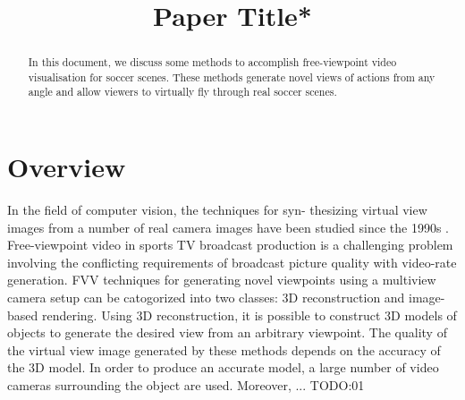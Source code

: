\documentclass[conference]{IEEEtran}
\begin{document}
\title{Paper Title*\\
}

\author{
}

\maketitle

\begin{abstract}
In this document, we discuss some methods to accomplish free-viewpoint video visualisation for soccer scenes.
These methods generate novel views of actions from any angle and allow viewers to virtually fly through real soccer scenes.
\end{abstract}




\section{Overview}
In the field of computer vision, the techniques for syn-
thesizing virtual view images from a number of real camera
images have been studied since the 1990s \cite{b1,b2,b3}.
Free-viewpoint video in sports TV broadcast production is a challenging problem involving the conflicting requirements of 
broadcast picture quality with video-rate generation.
FVV techniques for generating novel viewpoints using a multiview camera setup can be catogorized into two classes: 
3D reconstruction and image-based rendering. Using 3D reconstruction, it is possible to construct 3D models of objects to
generate the desired view from an arbitrary viewpoint. The quality of the virtual view image generated
by these methods depends on the accuracy of the 3D model. In order to produce an accurate model, a
large number of video cameras surrounding the object are used. Moreover, ... TODO:01
\end{document}
